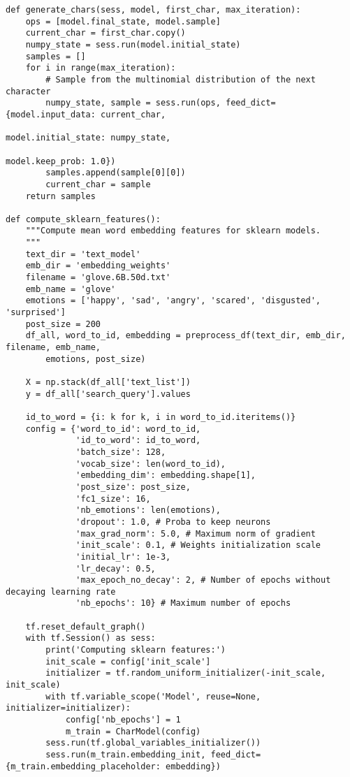 \begin{lstlisting}
def generate_chars(sess, model, first_char, max_iteration):
    ops = [model.final_state, model.sample]
    current_char = first_char.copy()
    numpy_state = sess.run(model.initial_state)
    samples = []
    for i in range(max_iteration):
        # Sample from the multinomial distribution of the next character
        numpy_state, sample = sess.run(ops, feed_dict={model.input_data: current_char,
                                                       model.initial_state: numpy_state,
                                                       model.keep_prob: 1.0})
        samples.append(sample[0][0])
        current_char = sample
    return samples

def compute_sklearn_features():
    """Compute mean word embedding features for sklearn models.
    """
    text_dir = 'text_model'
    emb_dir = 'embedding_weights'
    filename = 'glove.6B.50d.txt'
    emb_name = 'glove'
    emotions = ['happy', 'sad', 'angry', 'scared', 'disgusted', 'surprised']
    post_size = 200
    df_all, word_to_id, embedding = preprocess_df(text_dir, emb_dir, filename, emb_name, 
        emotions, post_size)

    X = np.stack(df_all['text_list'])
    y = df_all['search_query'].values

    id_to_word = {i: k for k, i in word_to_id.iteritems()}
    config = {'word_to_id': word_to_id,
              'id_to_word': id_to_word,
              'batch_size': 128,
              'vocab_size': len(word_to_id),
              'embedding_dim': embedding.shape[1],
              'post_size': post_size,
              'fc1_size': 16,
              'nb_emotions': len(emotions),
              'dropout': 1.0, # Proba to keep neurons
              'max_grad_norm': 5.0, # Maximum norm of gradient
              'init_scale': 0.1, # Weights initialization scale
              'initial_lr': 1e-3,
              'lr_decay': 0.5,
              'max_epoch_no_decay': 2, # Number of epochs without decaying learning rate
              'nb_epochs': 10} # Maximum number of epochs
    
    tf.reset_default_graph()
    with tf.Session() as sess:
        print('Computing sklearn features:')
        init_scale = config['init_scale']
        initializer = tf.random_uniform_initializer(-init_scale, init_scale)    
        with tf.variable_scope('Model', reuse=None, initializer=initializer):
            config['nb_epochs'] = 1
            m_train = CharModel(config)
        sess.run(tf.global_variables_initializer())
        sess.run(m_train.embedding_init, feed_dict={m_train.embedding_placeholder: embedding})


\end{lstlisting}
